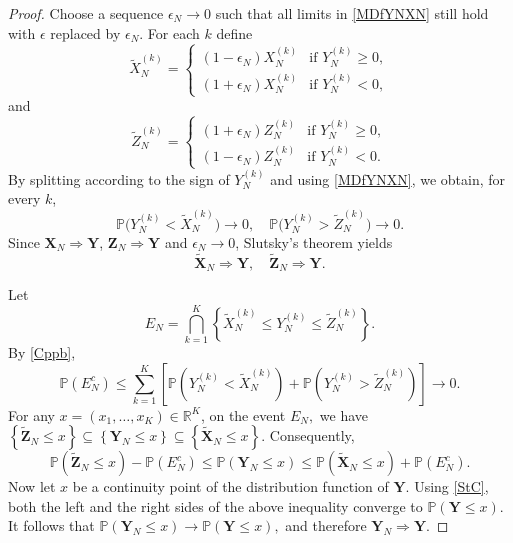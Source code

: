 \documentclass[11pt,twoside,a4paper,reqno]{amsart}
\begin{document}
\begin{proof}
Choose a sequence $\epsilon_N \to 0$ such that all limits in \eqref{MDfYNXN} still hold with $\epsilon$ replaced by $\epsilon_N$. For each $k$ define
\begin{equation*}
\widetilde{X}_N^{(k)}= \begin{cases}
(1-\epsilon_N) X_N^{(k)} & \text{if } Y_N^{(k)} \geq 0,\\
(1+\epsilon_N) X_N^{(k)} & \text{if } Y_N^{(k)} < 0,
\end{cases}
\end{equation*}
and
\begin{equation*}
\widetilde{Z}_N^{(k)}=\begin{cases}
(1+\epsilon_N) Z_N^{(k)} & \text{if } Y_N^{(k)} \geq 0,\\
(1-\epsilon_N) Z_N^{(k)} & \text{if } Y_N^{(k)} < 0.
\end{cases}
\end{equation*}
By splitting according to the sign of $Y_N^{(k)}$ and using \eqref{MDfYNXN}, we obtain, for every $k$,
\begin{equation}\label{Cppb}
\mathbb{P}\bigl(Y_N^{(k)} < \widetilde{X}_N^{(k)}\bigr) \to 0,\quad
\mathbb{P}\bigl(Y_N^{(k)} > \widetilde{Z}_N^{(k)}\bigr) \to 0.
\end{equation}
Since $\mathbf{X}_N \Rightarrow \mathbf{Y}$, $\mathbf{Z}_N \Rightarrow \mathbf{Y}$ and $\epsilon_N \to 0$, Slutsky's theorem yields
\begin{equation}\label{StC}
\widetilde{\mathbf{X}}_N \Rightarrow \mathbf{Y},\quad \widetilde{\mathbf{Z}}_N \Rightarrow \mathbf{Y}.
\end{equation}

Let
$$E_N=\bigcap_{k=1}^{K}\left\{\widetilde X_N^{(k)}\le Y_N^{(k)}\le\widetilde Z_N^{(k)}\right\}.$$
By \eqref{Cppb},
$$\mathbb P(E_N^c)\le\sum_{k=1}^{K}\left[\mathbb P\left(Y_N^{(k)}<\widetilde X_N^{(k)}\right)
+\mathbb P\left(Y_N^{(k)}>\widetilde Z_N^{(k)}\right)\right]\to0.
$$
For any $x=(x_1,\ldots,x_K)\in\mathbb R^K$, on the event $E_N,$ we have $\left\{\widetilde{\mathbf Z}_N\le x\right\}\subseteq\left\{\mathbf Y_N\le x\right\}\subseteq\left\{\widetilde{\mathbf X}_N\le x\right\}.$
Consequently,
$$\mathbb P\left(\widetilde{\mathbf Z}_N\le x\right)-\mathbb P(E_N^c)\le\mathbb P\left(\mathbf Y_N\le x\right)\le\mathbb P\left(\widetilde{\mathbf X}_N\le x\right)+\mathbb P(E_N^c).
$$
Now let $x$ be a continuity point of the distribution function of $\mathbf Y$. Using \eqref{StC}, both the left and the right sides  of the above inequality converge to $\mathbb P(\mathbf Y\le x).$
It follows that $\mathbb P(\mathbf Y_N\le x)\longrightarrow\mathbb P(\mathbf Y\le x),$ and therefore $\mathbf Y_N\Rightarrow\mathbf Y.$
\end{proof}
\end{document}
